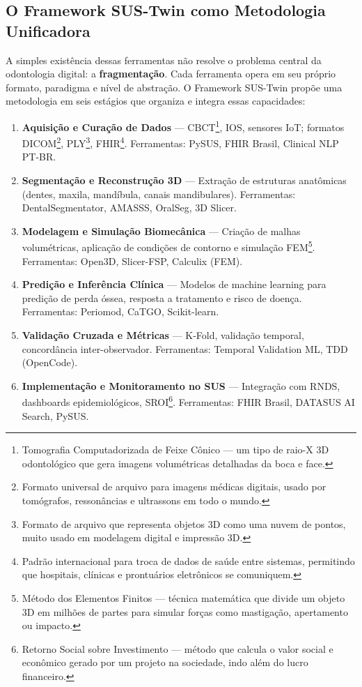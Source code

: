 \subsection{O Framework SUS-Twin como Metodologia Unificadora}

A simples existência dessas ferramentas não resolve o problema central da odontologia digital: a \textbf{fragmentação}. Cada ferramenta opera em seu próprio formato, paradigma e nível de abstração. O Framework SUS-Twin propõe uma metodologia em seis estágios que organiza e integra essas capacidades:

\begin{enumerate}
    \item \textbf{Aquisição e Curação de Dados} — CBCT\footnote[15]{Tomografia Computadorizada de Feixe Cônico — um tipo de raio-X 3D odontológico que gera imagens volumétricas detalhadas da boca e face.}, IOS, sensores IoT; formatos DICOM\footnote[16]{Formato universal de arquivo para imagens médicas digitais, usado por tomógrafos, ressonâncias e ultrassons em todo o mundo.}, PLY\footnote[17]{Formato de arquivo que representa objetos 3D como uma nuvem de pontos, muito usado em modelagem digital e impressão 3D.}, FHIR\footnote[18]{Padrão internacional para troca de dados de saúde entre sistemas, permitindo que hospitais, clínicas e prontuários eletrônicos se comuniquem.}. Ferramentas: PySUS, FHIR Brasil, Clinical NLP PT-BR.
    \item \textbf{Segmentação e Reconstrução 3D} — Extração de estruturas anatômicas (dentes, maxila, mandíbula, canais mandibulares). Ferramentas: DentalSegmentator, AMASSS, OralSeg, 3D Slicer.
    \item \textbf{Modelagem e Simulação Biomecânica} — Criação de malhas volumétricas, aplicação de condições de contorno e simulação FEM\footnote[19]{Método dos Elementos Finitos — técnica matemática que divide um objeto 3D em milhões de partes para simular forças como mastigação, apertamento ou impacto.}. Ferramentas: Open3D, Slicer-FSP, Calculix (FEM).
    \item \textbf{Predição e Inferência Clínica} — Modelos de machine learning para predição de perda óssea, resposta a tratamento e risco de doença. Ferramentas: Periomod, CaTGO, Scikit-learn.
    \item \textbf{Validação Cruzada e Métricas} — K-Fold, validação temporal, concordância inter-observador. Ferramentas: Temporal Validation ML, TDD (OpenCode).
    \item \textbf{Implementação e Monitoramento no SUS} — Integração com RNDS, dashboards epidemiológicos, SROI\footnote[20]{Retorno Social sobre Investimento — método que calcula o valor social e econômico gerado por um projeto na sociedade, indo além do lucro financeiro.}. Ferramentas: FHIR Brasil, DATASUS AI Search, PySUS.
\end{enumerate}

